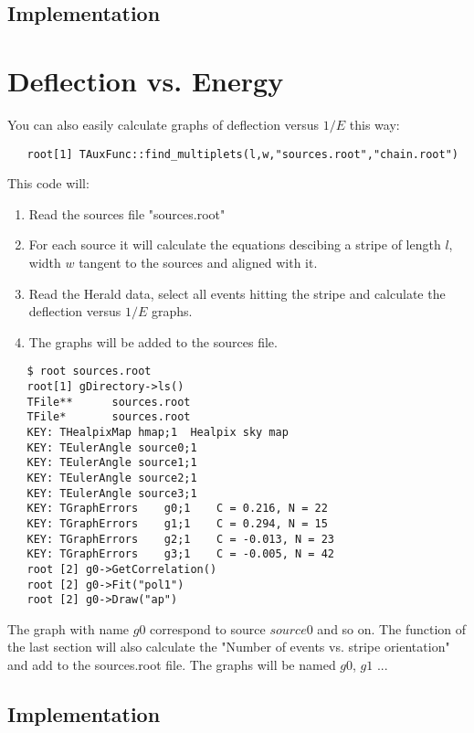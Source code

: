 \documentclass[12pt]{report}
\begin{document}
\subsection{Implementation}

\section{Deflection vs. Energy} \label{ch::raios-cosmicos}
You can also easily calculate graphs of deflection versus $1/E$ this way:
{ \color{brown}
   \begin{lstlisting}
   root[1] TAuxFunc::find_multiplets(l,w,"sources.root","chain.root")
   \end{lstlisting}
}
This code will:
\begin{enumerate}
\item Read the sources file {\color{brown}"sources.root"}
\item For each source it will calculate the equations descibing a stripe of
length $l$, width $w$ tangent to the sources and aligned with it.
\item Read the Herald data, select all events hitting the stripe and calculate 
the deflection versus $1/E$ graphs.
\item The graphs will be added to the sources file.
\end{enumerate}


{ \color{brown}
   \begin{lstlisting}
   $ root sources.root
   root[1] gDirectory->ls()
   TFile**		sources.root	
   TFile*		sources.root	
   KEY: THealpixMap	hmap;1	Healpix sky map
   KEY: TEulerAngle	source0;1	
   KEY: TEulerAngle	source1;1	
   KEY: TEulerAngle	source2;1	
   KEY: TEulerAngle	source3;1	
   KEY: TGraphErrors	g0;1	C = 0.216, N = 22
   KEY: TGraphErrors	g1;1	C = 0.294, N = 15
   KEY: TGraphErrors	g2;1	C = -0.013, N = 23
   KEY: TGraphErrors	g3;1	C = -0.005, N = 42
   root [2] g0->GetCorrelation()
   root [2] g0->Fit("pol1")
   root [2] g0->Draw("ap")
   \end{lstlisting}
}

The graph with name $g0$ correspond to source $source0$ and so on.
The function of the last section will also calculate the "Number of events vs. stripe orientation"
and add to the sources.root file. The graphs will be named $g0$, $g1$ ...

\subsection{Implementation}
\end{document}
